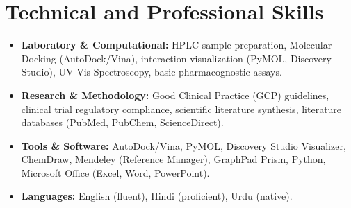 \documentclass[letterpaper,10pt]{article}
\begin{document}
\section{Technical and Professional Skills}
\vspace{1pt}
\begin{itemize}[leftmargin=0.15in, label={}, itemsep=1pt, parsep=0pt]

  \small \item \textbf{Laboratory \& Computational:} HPLC sample preparation, Molecular Docking (AutoDock/Vina), interaction visualization (PyMOL, Discovery Studio), UV-Vis Spectroscopy, basic pharmacognostic assays.

  \small \item \textbf{Research \& Methodology:} Good Clinical Practice (GCP) guidelines, clinical trial regulatory compliance, scientific literature synthesis, literature databases (PubMed, PubChem, ScienceDirect).

  \small \item \textbf{Tools \& Software:} AutoDock/Vina, PyMOL, Discovery Studio Visualizer, ChemDraw, Mendeley (Reference Manager), GraphPad Prism, Python, Microsoft Office (Excel, Word, PowerPoint).

  \small \item \textbf{Languages:} English (fluent), Hindi (proficient), Urdu (native).

\end{itemize}
\end{document}
